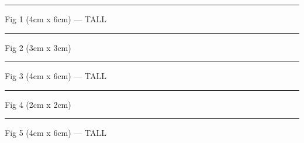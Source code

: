 \documentclass[a4paper,11pt]{article}
\begin{document}
\maketitle
\begin{swarmwrap}%
  \begin{minipage}[t]{4cm}\centering\rule{\linewidth}{6cm}{\footnotesize Fig 1 (4cm x 6cm) --- TALL}\end{minipage}%
\end{swarmwrap}%
\swarmwrapnext
\lipsum[1-5]%
\begin{swarmwrap}%
  \begin{minipage}[t]{3cm}\centering\rule{\linewidth}{3cm}{\footnotesize Fig 2 (3cm x 3cm)}\end{minipage}%
\end{swarmwrap}%
\swarmwrapnext
\lipsum[6-8]%
\begin{swarmwrap}%
  \begin{minipage}[t]{4cm}\centering\rule{\linewidth}{6cm}{\footnotesize Fig 3 (4cm x 6cm) --- TALL}\end{minipage}%
\end{swarmwrap}%
\swarmwrapnext
\lipsum[9-13]%
\begin{swarmwrap}%
  \begin{minipage}[t]{2cm}\centering\rule{\linewidth}{2cm}{\footnotesize Fig 4 (2cm x 2cm)}\end{minipage}%
\end{swarmwrap}%
\swarmwrapnext
\lipsum[14-16]%
\begin{swarmwrap}%
  \begin{minipage}[t]{4cm}\centering\rule{\linewidth}{6cm}{\footnotesize Fig 5 (4cm x 6cm) --- TALL}\end{minipage}%
\end{swarmwrap}%
\swarmwrapnext
\lipsum[17-21]%
\end{document}
